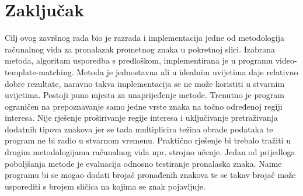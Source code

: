 \newpage
\setcounter{figure}{0}

\section{Zaključak} %
\label{sec:Zaključak}

Cilj ovog završnog rada bio je razrada i implementacija jedne od
metodologija računalnog vida za pronalazak prometnog znaka u pokretnoj
slici. Izabrana metoda, algoritam usporedba s predloškom, implementirana
je u programu video-template-matching. Metoda je jednostavna ali u
idealnim uvijetima daje relativno dobre rezultate, naravno takva
implementacija se ne može koristiti u stvarnim uvijetima. Postoji puno
mjesta za unaprijeđenje metode. Trenutno je program ograničen na
prepoznavanje samo jedne vrste znaka na točno određenoj regiji interesa.
Nije rješenje proširivanje regije interesa i uključivanje pretraživanja
dodatnih tipova znakova jer se tada multiplicira težina obrade podataka
te program ne bi radio u stvarnom vremenu. Praktično rješenje bi trebalo
tražiti u drugim metodologijama računalnog vida npr. strojno učenje.
Jedan od prijedloga poboljšanja metode je evaluacija odnosno testiranje
pronalaska znaka. Naime programu bi se mogao dodati brojač pronađenih
znakova te se takav brojač može usporediti s brojem sličica na kojima se
znak pojavljuje.

